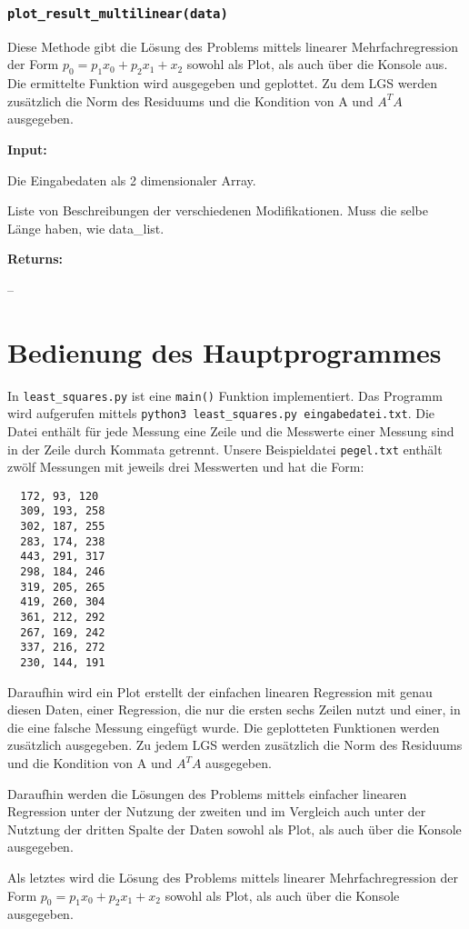 \documentclass[smallheadings]{scrartcl}
\newcommand{\initem}[2]{\item[\hspace{0.5em} {\normalfont\ttfamily{#1}} {\normalfont\itshape{(#2)}}]}
\newcommand{\outitem}[1]{\item[\hspace{0.5em} \normalfont\itshape{(#1)}]}
\newcommand{\bfpara}[1]{\noindent \textbf{#1:}\,}
\begin{document}
\subsubsection{\texttt{plot\_result\_multilinear(data)}}
Diese Methode gibt die Lösung des Problems mittels linearer Mehrfachregression der Form $p_0 = p_1 x_0 +p_2 x_1 + x_2$ sowohl als Plot, als auch über die Konsole aus.
Die ermittelte Funktion wird ausgegeben und geplottet.
Zu dem LGS werden zusätzlich die Norm des Residuums und die Kondition von A und $A^T A$ ausgegeben.

\bfpara{Input}
    \begin{compactdesc}
		    \initem{data}{2d-array} Die Eingabedaten als 2 dimensionaler Array.
		    \initem{labels}{list of strings} Liste von Beschreibungen der verschiedenen Modifikationen. Muss die selbe Länge haben, wie data\_list.
		\end{compactdesc}
\bfpara{Returns}
    \begin{compactdesc}
		  \outitem{None} --
	  \end{compactdesc}

\section{Bedienung des Hauptprogrammes}
In \texttt{least\_squares.py} ist eine \texttt{main()} Funktion implementiert.
Das Programm wird aufgerufen mittels \texttt{python3 least\_squares.py eingabedatei.txt}.
Die Datei enthält für jede Messung eine Zeile und die Messwerte einer Messung sind in der Zeile durch Kommata getrennt.
Unsere Beispieldatei \texttt{pegel.txt} enthält zwölf Messungen mit jeweils drei Messwerten und hat die Form:

\begin{verbatim}
  172, 93, 120
  309, 193, 258
  302, 187, 255
  283, 174, 238
  443, 291, 317
  298, 184, 246
  319, 205, 265
  419, 260, 304
  361, 212, 292
  267, 169, 242
  337, 216, 272
  230, 144, 191
\end{verbatim}

Daraufhin wird ein Plot erstellt der einfachen linearen Regression mit genau diesen Daten, einer Regression, die nur die ersten sechs Zeilen nutzt und einer, in die eine falsche Messung eingefügt wurde.
Die geplotteten Funktionen werden zusätzlich ausgegeben.
Zu jedem LGS werden zusätzlich die Norm des Residuums und die Kondition von A und $A^T A$ ausgegeben.

Daraufhin werden die Lösungen des Problems mittels einfacher linearen Regression unter der Nutzung der zweiten und im Vergleich auch unter der Nutztung der dritten Spalte der Daten sowohl als Plot, als auch über die Konsole ausgegeben.

Als letztes wird die Lösung des Problems mittels linearer Mehrfachregression der Form $p_0 = p_1 x_0 +p_2 x_1 + x_2$ sowohl als Plot, als auch über die Konsole ausgegeben.
\end{document}
